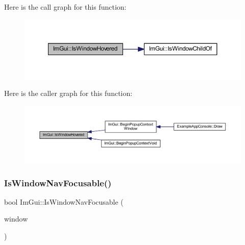 Here is the call graph for this function\+:
\nopagebreak
\begin{figure}[H]
\begin{center}
\leavevmode
\includegraphics[width=350pt]{namespace_im_gui_aaed1ebf40cc2cb2ec30b0ba39b91d4a5_cgraph}
\end{center}
\end{figure}
Here is the caller graph for this function\+:
\nopagebreak
\begin{figure}[H]
\begin{center}
\leavevmode
\includegraphics[width=350pt]{namespace_im_gui_aaed1ebf40cc2cb2ec30b0ba39b91d4a5_icgraph}
\end{center}
\end{figure}
\mbox{\label{namespace_im_gui_a6dfaa7187edcbc862be2edb2bbc987bb}} 
\subsubsection{\texorpdfstring{Is\+Window\+Nav\+Focusable()}{IsWindowNavFocusable()}}
{\footnotesize\ttfamily bool Im\+Gui\+::\+Is\+Window\+Nav\+Focusable (\begin{DoxyParamCaption}\item[{\mbox{\hyperlink{struct_im_gui_window}{Im\+Gui\+Window}} $\ast$}]{window }\end{DoxyParamCaption})}

\mbox{\label{namespace_im_gui_aa6e503009550f5e42d6eb4c146090929}} 
